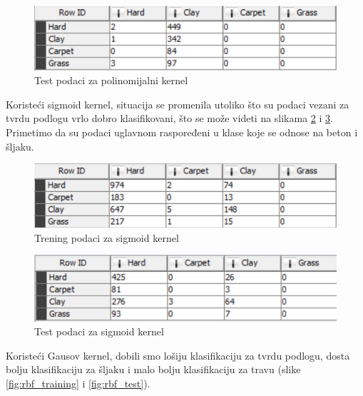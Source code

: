 \documentclass[a4paper]{article}
\begin{document}
\begin{figure}[h!]
	\begin{center}
		\includegraphics[scale=0.80]{KNIME_project/SVM/poly_test}
	\end{center}
	\caption{Test podaci za polinomijalni kernel}
	\label{fig:poly_test}
\end{figure}


Koristeći sigmoid kernel, situacija se promenila utoliko što su podaci vezani za tvrdu podlogu
vrlo dobro klasifikovani, što se može videti na slikama \ref{fig:sigmoid_training} i \ref{fig:sigmoid_test}.
Primetimo da su podaci uglavnom raspoređeni u klase koje se odnose na beton i šljaku.

\begin{figure}[h!]
	\begin{center}
		\includegraphics[scale=0.80]{KNIME_project/SVM/sigmoid_training}
	\end{center}
	\caption{Trening podaci za sigmoid kernel}
	\label{fig:sigmoid_training}
\end{figure}

\begin{figure}[h!]
	\begin{center}
		\includegraphics[scale=0.80]{KNIME_project/SVM/sigmoid_test}
	\end{center}
	\caption{Test podaci za sigmoid kernel}
	\label{fig:sigmoid_test}
\end{figure}

Koristeći Gausov kernel, dobili smo lošiju klasifikaciju za tvrdu podlogu, dosta bolju klasifikaciju za šljaku
i malo bolju klasifikaciju za travu (slike \ref{fig:rbf_training} i \ref{fig:rbf_test}). \\
\end{document}
